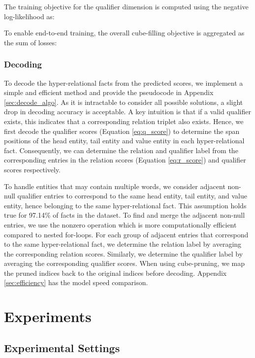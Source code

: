 \documentclass[11pt]{article}
\begin{document}
The training objective for the qualifier dimension is computed using the negative log-likelihood as:

To enable end-to-end training, the overall cube-filling objective is aggregated as the sum of losses:


\subsubsection{Decoding}
To decode the hyper-relational facts from the predicted scores, we implement a simple and efficient method and provide the pseudocode in Appendix \ref{sec:decode_algo}.
As it is intractable to consider all possible solutions, a slight drop in decoding accuracy is acceptable.
A key intuition is that if a valid qualifier exists, this indicates that a corresponding relation triplet also exists.
Hence, we first decode the qualifier scores 
(Equation \ref{eq:q_score})
to determine the span positions of the head entity, tail entity and value entity in each hyper-relational fact.
Consequently, we can determine the relation and qualifier label from the corresponding entries in the relation scores (Equation \ref{eq:r_score}) and qualifier scores respectively.

To handle entities that may contain multiple words, we consider adjacent non-null qualifier entries to correspond to the same head entity, tail entity, and value entity, hence belonging to the same hyper-relational fact. 
This assumption holds true for 97.14\% of facts in the dataset.
To find and merge the adjacent non-null entries, we use the nonzero operation which is more computationally efficient compared to nested for-loops.
For each group of adjacent entries that correspond to the same hyper-relational fact, we determine the relation label by averaging the corresponding relation scores.
Similarly, we determine the qualifier label by averaging the corresponding qualifier scores.
When using cube-pruning, we map the pruned indices back to the original indices before decoding.
Appendix \ref{sec:efficiency} has the model speed comparison.





\section{Experiments}

\subsection{Experimental Settings}
\end{document}
